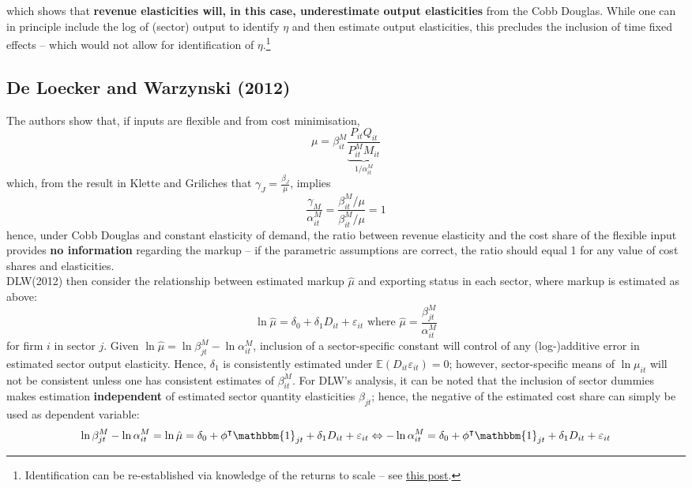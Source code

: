 \documentclass[11pt]{article}
\begin{document}
which shows that \textbf{revenue elasticities will, in this case, underestimate output elasticities} from the Cobb Douglas.
While one can in principle include the log of (sector) output to identify $\eta$ and then estimate output elasticities, this precludes the inclusion of time fixed effects -- which would not allow for identification of $\eta$.\footnote{Identification can be re-established via knowledge of the returns to scale -- see \href{https://gfrt0.github.io/nugae/2019/03/markups/}{this post}.}

\subsection{De Loecker and Warzynski (2012)}

The authors show that, if inputs are flexible and from cost minimisation,
\begin{equation}
	\mu = \beta^M_{it} \underbrace{\frac{P_{it}Q_{it}}{P^M_{it}M_{it}}}_{1/\alpha^{M}_{it}}
\end{equation}
which, from the result in Klette and Griliches that $\gamma_J = \frac{\beta_J}{\mu}$, implies
\begin{equation}
	\frac{\gamma_M}{\alpha^M_{it}} = \frac{\beta^M_{it} / \mu}{\beta^M_{it} / \mu} = 1
\end{equation}
hence, under Cobb Douglas and constant elasticity of demand, the ratio between revenue elasticity and the cost share of the flexible input provides \textbf{no information} regarding the markup -- if the parametric assumptions are correct, the ratio should equal 1 for any value of cost shares and elasticities. \\

DLW(2012) then consider the relationship between estimated markup $\hat{\mu}$ and exporting status in each sector, where markup is estimated as above:
\begin{equation}
	\ln \hat{\mu} = \delta_0 + \delta_1 D_{it} + \varepsilon_{it} \text{ where } \hat{\mu} = \frac{\beta^M_{jt}}{\alpha^{M}_{it}}
\end{equation}
for firm $i$ in sector $j$.
Given $\ln \hat{\mu} = \ln \beta^M_{jt} - \ln \alpha^{M}_{it}$, inclusion of a sector-specific constant will control of any (log-)additive error in estimated sector output elasticity.
Hence, $\delta_1$ is consistently estimated under $\mathbb{E}(D_{it}\varepsilon_{it}) = 0$; however, sector-specific means of $\ln \mu_{it}$ will not be consistent unless one has consistent estimates of $\beta^M_{it}$.
For DLW's analysis, it can be noted that the inclusion of sector dummies makes estimation \textbf{independent} of estimated sector quantity elasticities $\beta_{jt}$; hence, the negative of the estimated cost share can simply be used as dependent variable:
\begin{equation*}
	\ln \beta^M_{jt} - \ln \alpha^{M}_{it} = \ln \hat{\mu} = \delta_0 + \phi^\intercal \mathbbm{1}_{jt} + \delta_1 D_{it} + \varepsilon_{it} \Leftrightarrow - \ln \alpha^{M}_{it} = \delta_0 + \phi^\intercal \mathbbm{1}_{jt} + \delta_1 D_{it} + \varepsilon_{it}
\end{equation*}
\end{document}
